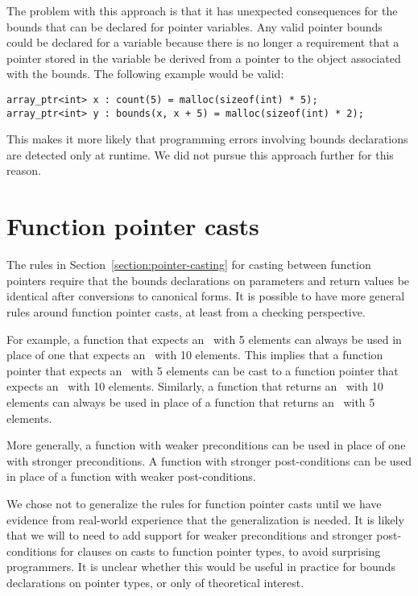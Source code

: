 The problem with this approach is that it has unexpected consequences
for the bounds that can be declared for pointer variables.
Any valid pointer bounds could be declared for a variable because there
is no longer a requirement that a pointer stored in the variable be
derived from a pointer to the object associated with the bounds. The
following example would be valid:

\begin{lstlisting}
array_ptr<int> x : count(5) = malloc(sizeof(int) * 5);
array_ptr<int> y : bounds(x, x + 5) = malloc(sizeof(int) * 2);
\end{lstlisting}

This makes it more likely that programming errors involving bounds
declarations are detected only at runtime.   We did not pursue
this approach further for this reason.

\section{Function pointer casts}

The rules in Section~\ref{section:pointer-casting} for casting between function
pointers require that the bounds declarations on parameters and return values be
identical after conversions to canonical forms.   It is possible to have
more general rules around function pointer casts, at least from a checking
perspective.

For example, a function that expects an \arrayptr\ with 5 elements can
always be used in place of one that expects an \arrayptr\ with 10 elements.
This implies that a function pointer that expects an \arrayptr\ with 5
elements can be cast to a function pointer that expects an \arrayptr\ with
10 elements.  Similarly, a function that returns an \arrayptr\ with 10 elements
can always be used in place of a function that returns an \arrayptr\ with 5
elements.

More generally, a function with weaker preconditions can be used in place
of one with stronger preconditions.  A function with stronger post-conditions
can be used in place of a function with weaker post-conditions.

We chose not to generalize the rules for function pointer casts until we have
evidence from real-world experience that the generalization is needed.   It is
likely that we will to need to add support for weaker preconditions and stronger
post-conditions for  clauses on casts to function pointer types,
to avoid surprising programmers.  It is unclear whether this would be useful in
practice for bounds declarations on pointer types, or only of theoretical
interest.

